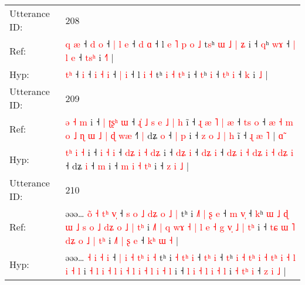 \documentclass[10pt]{article}
\DeclareRobustCommand{\hl}[1]{{\textcolor{red}{#1}}}
\begin{document}
\begin{longtable}{ll}
 \\
\midrule
Utterance ID: & 208 \\
Ref: & \hl{q}\hl{ }\hl{æ} ˧\hl{ }\hl{d} \hl{o} ˧ \hl{|} \hl{l} \hl{e} ˧ \hl{d} \hl{ɑ} ˧ l\hl{ }\hl{e}\hl{ }\hl{˥}\hl{ }\hl{p} \hl{o} \hl{˩} t\hl{s}ʰ \hl{ɯ} \hl{˩} \hl{|}\hl{ }\hl{ʑ} i ˧ \hl{q}ʰ \hl{w}\hl{ɤ} ˧ \hl{|}\hl{ }\hl{l} \hl{e} ˧ \hl{t}\hl{s}\hl{ʰ} i \hl{˧}\hl{˥} |
 \\
Hyp: & \hl{}\hl{t}\hl{ʰ} ˧\hl{}\hl{} \hl{i} ˧ \hl{i} \hl{˧} \hl{i} ˧ \hl{|} \hl{i} ˧ l\hl{}\hl{}\hl{}\hl{}\hl{}\hl{} \hl{i} \hl{˧} t\hl{}ʰ \hl{i} \hl{˧} \hl{}\hl{t}\hl{ʰ} i ˧ \hl{t}ʰ \hl{}\hl{i} ˧ \hl{}\hl{t}\hl{ʰ} \hl{i} ˧ \hl{}\hl{}\hl{k} i \hl{}\hl{˩} |
 \\
\midrule
Utterance ID: & 209 \\
Ref: & \hl{}\hl{ə} \hl{˧} \hl{m} i ˧ \hl{|} \hl{ʈ}\hl{ʂ}\hl{ʰ} \hl{ɯ} ˧\hl{ }\hl{ɻ}\hl{̍} \hl{˩}\hl{ }\hl{s} \hl{e} \hl{˩} \hl{|}\hl{ }\hl{h} i\hl{̃} ˧\hl{ }\hl{ɻ}\hl{ }\hl{æ} \hl{˥}\hl{ }\hl{|} \hl{æ} ˧ \hl{t}\hl{s} \hl{o} ˧ \hl{æ}\hl{ }\hl{˧} \hl{m} \hl{o} \hl{˩}\hl{ }\hl{ɳ} \hl{ɯ} \hl{˩} \hl{|}\hl{ }\hl{ɖ} \hl{w}\hl{æ} ˧\hl{˥}\hl{ }\hl{|} dʑ \hl{o} ˧\hl{ }\hl{|} \hl{p} i ˧ \hl{z} \hl{o} \hl{˩} \hl{|}\hl{ }\hl{h} i\hl{̃} ˧ \hl{ɻ} \hl{æ} \hl{˥} |\hl{ }\hl{ɑ}\hl{̃}
 \\
Hyp: & \hl{t}\hl{ʰ} \hl{i} \hl{˧} i ˧ \hl{i} \hl{}\hl{}\hl{˧} \hl{i} ˧\hl{}\hl{}\hl{} \hl{}\hl{d}\hl{ʑ} \hl{i} \hl{˧} \hl{}\hl{d}\hl{ʑ} i\hl{} ˧\hl{}\hl{}\hl{}\hl{} \hl{}\hl{d}\hl{ʑ} \hl{i} ˧ \hl{d}\hl{ʑ} \hl{i} ˧ \hl{}\hl{d}\hl{ʑ} \hl{i} \hl{˧} \hl{}\hl{d}\hl{ʑ} \hl{i} \hl{˧} \hl{}\hl{d}\hl{ʑ} \hl{}\hl{i} ˧\hl{}\hl{}\hl{} dʑ \hl{i} ˧\hl{}\hl{} \hl{m} i ˧ \hl{m} \hl{i} \hl{˧} \hl{}\hl{t}\hl{ʰ} i\hl{} ˧ \hl{z} \hl{i} \hl{˩} |\hl{}\hl{}\hl{}
 \\
\midrule
Utterance ID: & 210 \\
Ref: & əəə… \hl{o}\hl{̃} \hl{˧} \hl{t}\hl{ʰ} \hl{v}\hl{̩} ˧ \hl{s} \hl{o} \hl{˩} \hl{d}\hl{ʑ}\hl{ }\hl{o} \hl{˩} \hl{|} tʰ i \hl{˩}\hl{˥} \hl{|}\hl{ }\hl{ʂ} \hl{e} ˧ \hl{m}\hl{ }\hl{v}\hl{̩} ˧ \hl{k}ʰ \hl{ɯ} \hl{˩} \hl{}\hl{ɖ} \hl{ɯ} \hl{˩} \hl{s}\hl{ }\hl{o} \hl{˩} \hl{d}\hl{ʑ} \hl{o} \hl{˩} \hl{|} \hl{t}\hl{ʰ} i \hl{˩}\hl{˥} \hl{|} \hl{q} \hl{w}\hl{ɤ} \hl{˧} \hl{|} \hl{l} \hl{e} \hl{˧} \hl{g} \hl{v}\hl{̩} \hl{˩} \hl{|} \hl{t}\hl{ʰ} i ˧\hl{ }\hl{t}\hl{ɕ} \hl{ɯ} \hl{˥} \hl{d}\hl{ʑ} \hl{o} \hl{˩} \hl{|} \hl{t}\hl{ʰ} i \hl{˩}\hl{˥} \hl{|}\hl{ }\hl{ʂ} \hl{e} ˧ \hl{k}\hl{ʰ} \hl{ɯ} \hl{˧} |
 \\
Hyp: & əəə… \hl{}\hl{˧} \hl{i} \hl{}\hl{˧} \hl{}\hl{i} ˧ \hl{|} \hl{i} \hl{˧} \hl{}\hl{}\hl{t}\hl{ʰ} \hl{i} \hl{˧} tʰ i \hl{}\hl{˧} \hl{}\hl{t}\hl{ʰ} \hl{i} ˧ \hl{t}\hl{ʰ}\hl{ }\hl{i} ˧ \hl{t}ʰ \hl{i} \hl{˧} \hl{t}\hl{ʰ} \hl{i} \hl{˧} \hl{}\hl{t}\hl{ʰ} \hl{i} \hl{}\hl{˧} \hl{l} \hl{i} \hl{˧} \hl{}\hl{l} i \hl{}\hl{˧} \hl{l} \hl{i} \hl{}\hl{˧} \hl{l} \hl{i} \hl{˧} \hl{l} \hl{i} \hl{˧} \hl{}\hl{l} \hl{i} \hl{˧} \hl{}\hl{l} i ˧\hl{}\hl{}\hl{} \hl{l} \hl{i} \hl{}\hl{˧} \hl{l} \hl{i} \hl{˧} \hl{}\hl{l} i \hl{}\hl{˧} \hl{}\hl{t}\hl{ʰ} \hl{i} ˧ \hl{}\hl{z} \hl{i} \hl{˩} |

\end{longtable}
\end{document}
